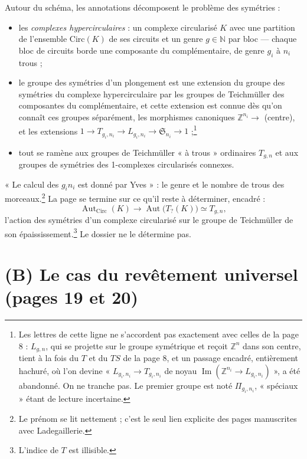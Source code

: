 \documentclass[11pt,a4paper]{article}
\begin{document}
Autour du schéma, les annotations décomposent le problème des symétries :
\begin{itemize}
\item les \emph{complexes hypercirculaires} : un complexe circularisé $K$ avec
une partition de l'ensemble $\mathrm{Circ}(K)$ de ses circuits et un genre
$g \in \mathbb{N}$ par bloc — chaque bloc de circuits borde une composante
du complémentaire, de genre $g_i$ à $n_i$ trous ;
\item le groupe des symétries d'un plongement est une extension du groupe des
symétries du complexe hypercirculaire par les groupes de Teichmüller des
composantes du complémentaire, et cette extension est connue dès qu'on
connaît ces groupes séparément, les morphismes canoniques $\mathbb{Z}^{n_i}
\to$ (centre), et les extensions $1 \to T_{g_i, n_i} \to L_{g_i, n_i} \to
\mathfrak{S}_{n_i} \to 1$ ;\footnote{Les lettres de cette ligne ne
s'accordent pas exactement avec celles de la page 8 : $L_{g,n}$, qui se
projette sur le groupe symétrique et reçoit $\mathbb{Z}^{n}$ dans son centre,
tient à la fois du $T$ et du $TS$ de la page 8, et un passage encadré,
entièrement hachuré, où l'on devine « $L_{g_i, n_i} \to T_{g_i, n_i}$ de
noyau $\operatorname{Im}(\mathbb{Z}^{n_i} \to L_{g_i, n_i})$ », a été
abandonné. On ne tranche pas. Le premier groupe est noté $\Pi_{g_i, n_i}$,
« spéciaux » étant de lecture incertaine.}
\item tout se ramène aux groupes de Teichmüller « à trous » ordinaires
$T_{g,n}$ et aux groupes de symétries des 1-complexes circularisés connexes.
\end{itemize}
« Le calcul des $g_i n_i$ est donné par Yves » : le genre et le nombre de
trous des morceaux.\footnote{Le prénom se lit nettement ; c'est le seul lien
explicite des pages manuscrites avec Ladegaillerie.} La page se termine sur
ce qu'il reste à déterminer, encadré :
\[
  \operatorname{Aut}_{\mathrm{Circ}}(K) \longrightarrow
  \operatorname{Aut}\bigl(T_{?}(K)\bigr) \simeq T_{g,n} ,
\]
l'action des symétries d'un complexe circularisé sur le groupe de Teichmüller
de son épaississement.\footnote{L'indice de $T$ est illisible.} Le dossier
ne le détermine pas.

\section*{(B) Le cas du revêtement universel (pages 19 et 20)}
\end{document}
